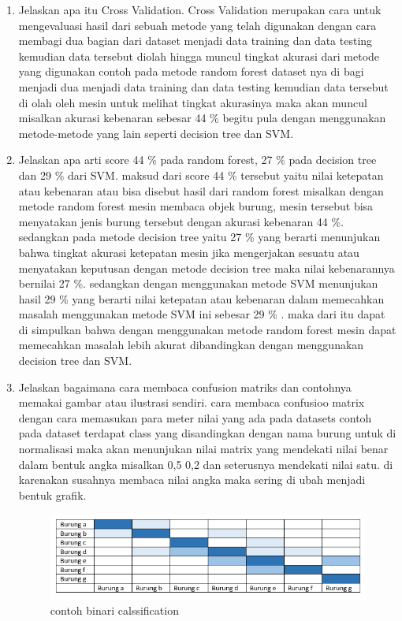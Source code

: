 \begin{enumerate}
\item Jelaskan apa itu Cross Validation.
Cross Validation merupakan cara untuk mengevaluasi hasil dari sebuah metode yang telah digunakan dengan cara membagi dua bagian dari dataset menjadi data training dan data testing kemudian data tersebut diolah hingga muncul tingkat akurasi dari metode yang digunakan contoh pada metode random forest dataset nya di bagi menjadi dua menjadi data training dan data testing kemudian data tersebut di olah oleh mesin untuk melihat tingkat akurasinya maka akan muncul misalkan akurasi kebenaran sebesar 44 \% begitu pula dengan menggunakan metode-metode yang lain seperti decision tree dan SVM.


\item Jelaskan apa arti score 44 \% pada random forest, 27 \% pada decision tree dan 29 \% dari SVM.
maksud dari score 44 \% tersebut yaitu nilai ketepatan atau kebenaran atau bisa disebut hasil dari random forest misalkan dengan metode random forest mesin membaca objek burung, mesin tersebut bisa menyatakan jenis burung tersebut dengan akurasi kebenaran 44 \%. sedangkan pada metode decision tree yaitu 27 \% yang berarti menunjukan bahwa tingkat akurasi ketepatan mesin jika mengerjakan sesuatu atau menyatakan keputusan dengan metode decision tree maka nilai kebenarannya bernilai 27 \%. sedangkan dengan menggunakan metode SVM menunjukan hasil 29 \% yang berarti nilai ketepatan atau kebenaran dalam memecahkan masalah menggunakan metode SVM ini sebesar 29 \% . maka dari itu dapat di simpulkan bahwa dengan menggunakan metode random forest mesin dapat memecahkan masalah lebih akurat dibandingkan dengan menggunakan decision tree dan SVM.


\item Jelaskan bagaimana cara membaca confusion matriks dan contohnya memakai gambar atau ilustrasi sendiri.
cara membaca confusioo matrix dengan cara memasukan para meter nilai yang ada pada datasets contoh pada dataset terdapat class yang disandingkan dengan nama burung untuk di normalisasi maka akan menunjukan nilai matrix yang mendekati nilai benar dalam bentuk angka misalkan 0,5 0,2 dan seterusnya mendekati nilai satu. di karenakan susahnya membaca nilai angka maka sering di ubah menjadi bentuk grafik. 
\begin{figure}[ht]
\centering
\includegraphics[scale=0.2]{figures/1174042/chapter3/1,2.PNG}
\caption{contoh binari calssification}
\label{contoh}
\end{figure}


\end{enumerate}
